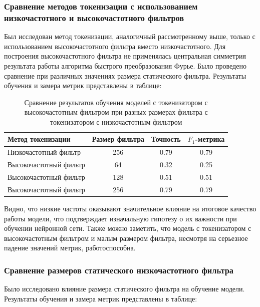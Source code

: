 \documentclass[times,specification,annotation]{itmo-student-thesis}
\begin{document}
\subsubsection{Сравнение методов токенизации с использованием низкочастотного и высокочастотного фильтров}

Был исследован метод токенизации, аналогичный рассмотренному выше, только с использованием высокочастотного фильтра вместо низкочастотного. Для построения высокочастотного фильтра не применялась центральная симметрия результата работы алгоритма быстрого преобразования Фурье. Было проведено сравнение при различных значениях размера статического фильтра. Результаты обучения и замера метрик представлены в таблице: 

\begin{table}[H]
  \centering
  \caption{Сравнение результатов обучения моделей с токенизатором с высокочастотным фильтром при разных размерах фильтра с токенизатором с низкочастотным фильтром}
  \label{tab:fft-tokenization-unshifted}
  \begin{tabular}{|l|c|c|c|}
    \hline
    Метод токенизации & Размер фильтра & Точность & $F_1$-метрика \\ \hline
    Низкочастотный фильтр & 256 & 0.79 & 0.79 \\
    Высокочастотный фильтр & 64 & 0.32 & 0.25 \\
    Высокочастотный фильтр & 128 & 0.51 & 0.51 \\
    Высокочастотный фильтр & 256 & 0.79 & 0.79 \\
    \hline
  \end{tabular}
\end{table}

Видно, что низкие частоты оказывают значительное влияние на итоговое качество работы модели, что подтверждает изначальную гипотезу о их важности при обучении нейронной сети. Также можно заметить, что модель с токенизатором с высокочастотным фильтром и малым размером фильтра, несмотря на серьезное падение значений метрик, работоспособна.

\subsubsection{Сравнение размеров статического низкочастотного фильтра}

Было исследовано влияние размера статического фильтра на обучение модели. Результаты обучения и замера метрик представлены в таблице:
\end{document}

